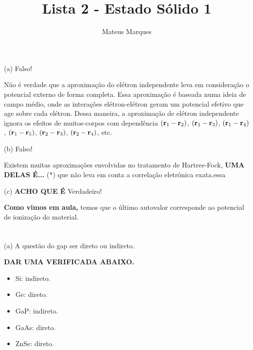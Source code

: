 \documentclass[a4paper,10pt]{article}
\title{\Huge{\textbf{Lista 2 - Estado Sólido 1}}}
\author{Mateus Marques}
\begin{document}
\maketitle

\section{}

(a) Falso!

\n

Não é verdade que a aproximação do elétron independente leva em consideração o potencial externo de forma completa. Essa aproximação é baseada numa ideia de campo médio, onde as interações elétron-elétron geram um potencial efetivo que age sobre cada elétron. Dessa maneira, a aproximação de elétron independente ignora os efeitos de muitos-corpos com dependência $({\vb{r}}_1 - {\vb{r}}_2)$, $({\vb{r}}_1 - {\vb{r}}_3)$, $({\vb{r}}_1 - {\vb{r}}_4)$,  $({\vb{r}}_1 - {\vb{r}}_5)$, $({\vb{r}}_2 - {\vb{r}}_3)$, $({\vb{r}}_2 - {\vb{r}}_4)$, etc.

\n\n

(b) Falso!

\n

Existem muitas aproximações envolvidas no tratamento de Hartree-Fock, \textbf{UMA DELAS É...} (*) que não leva em conta a correlação eletrônica exata.essa

\n\n

(c) \textbf{ACHO QUE É} Verdadeiro!

\n

\textbf{Como vimos em aula,} temos que o último autovalor corresponde ao potencial de ionização do material.

\pagebreak

\section{}

(a) A questão do gap ser direto ou indireto.

\textbf{DAR UMA VERIFICADA ABAIXO.}

\begin{itemize}
\item Si: indireto.
\item Ge: direto.
\item GaP: indireto.
\item GaAs: direto.
\item ZnSe: direto.
\end{itemize}

\n\n
\end{document}
